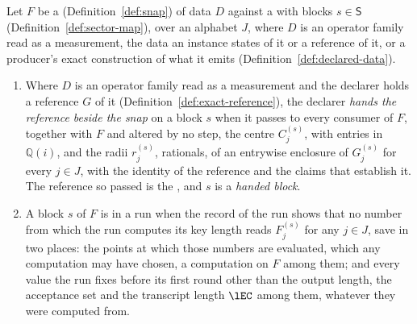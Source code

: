 \begin{definition}\label{def:evaluated-off-snap}
Let $F$ be a  (Definition~\ref{def:snap}) of data $D$ against a
 with blocks $s\in\mathsf{S}$
(Definition~\ref{def:sector-map}), over an alphabet $J$, where $D$ is an
operator family read as a measurement, the data an instance states of it or a
reference of it, or a producer's exact construction of what it emits
(Definition~\ref{def:declared-data}).
\begin{enumerate}[label=(\roman*),leftmargin=2.4em]
\item Where $D$ is an operator family read as a measurement and the declarer
  holds a reference $G$ of it (Definition~\ref{def:exact-reference}), the
  declarer \emph{hands the reference beside the snap} on a block $s$ when it
  passes to every consumer of $F$, together with $F$ and altered by no step,
  the centre $C^{(s)}_j$, with entries in $\mathbb{Q}(i)$, and the radii
  $r^{(s)}_j$, rationals, of an entrywise enclosure of $G^{(s)}_j$ for every
  $j\in J$, with the identity of the reference and the claims that establish
  it. The reference so passed is the
  ,
  and $s$ is a \emph{handed block}.
\item A block $s$ of $F$ is
  in a run when the record of the run shows that no number from which the run
  computes its key length reads $F^{(s)}_j$ for any $j\in J$, save in two
  places: the points at which those numbers are evaluated, which any
  computation may have chosen, a computation on $F$ among them; and every
  value the run fixes before its first round other than the output length,
  the acceptance set and the transcript length $\lEC$ among them, whatever
  they were computed from.
\end{enumerate}
\end{definition}
